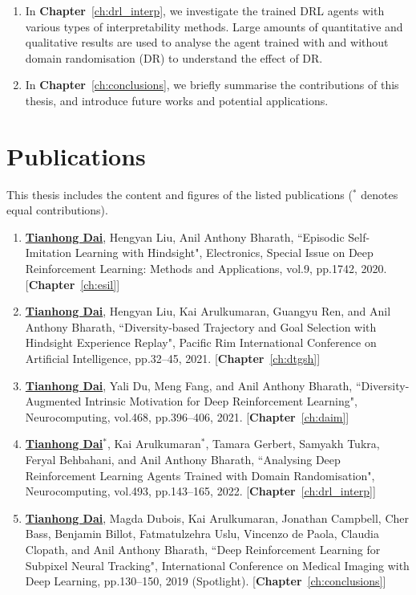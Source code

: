 \begin{enumerate}
    \item In \textbf{Chapter}~\ref{ch:drl_interp}, we investigate the trained DRL agents with various types of interpretability methods. Large amounts of quantitative and qualitative results are used to analyse the agent trained with and without domain randomisation (DR) to understand the effect of DR.
    
    \item In \textbf{Chapter}~\ref{ch:conclusions}, we briefly summarise the contributions of this thesis, and introduce future works and potential applications.
\end{enumerate}
\section{Publications}
This thesis includes the content and figures of the listed publications ($^{*}$ denotes equal contributions).
\begin{enumerate}
	\item \underline{\textbf{Tianhong Dai}}, Hengyan Liu, Anil Anthony Bharath, ``Episodic Self-Imitation Learning with Hindsight", Electronics, Special Issue on Deep Reinforcement Learning: Methods and Applications, vol.9, pp.1742, 2020. [\textbf{Chapter}~\ref{ch:esil}]
	\item \underline{\textbf{Tianhong Dai}}, Hengyan Liu, Kai Arulkumaran, Guangyu Ren, and Anil Anthony Bharath, ``Diversity‐based Trajectory and Goal Selection with Hindsight Experience Replay", Pacific Rim International Conference on Artificial Intelligence, pp.32--45, 2021. [\textbf{Chapter}~\ref{ch:dtgsh}]
	\item \underline{\textbf{Tianhong Dai}}, Yali Du, Meng Fang, and Anil Anthony Bharath, ``Diversity-Augmented Intrinsic Motivation for Deep Reinforcement Learning", Neurocomputing, vol.468, pp.396--406, 2021. [\textbf{Chapter}~\ref{ch:daim}]
	\item \underline{\textbf{Tianhong Dai}$^{*}$}, Kai Arulkumaran$^{*}$, Tamara Gerbert, Samyakh Tukra, Feryal Behbahani, and Anil Anthony Bharath, ``Analysing Deep Reinforcement Learning Agents Trained with Domain Randomisation", Neurocomputing, vol.493, pp.143--165, 2022. [\textbf{Chapter}~\ref{ch:drl_interp}]
	\item \underline{\textbf{Tianhong Dai}}, Magda Dubois, Kai Arulkumaran, Jonathan Campbell, Cher Bass, Benjamin Billot, Fatmatulzehra Uslu, Vincenzo de Paola, Claudia Clopath, and Anil Anthony Bharath, ``Deep Reinforcement Learning for Subpixel Neural Tracking", International Conference on Medical Imaging with Deep Learning, pp.130--150, 2019 (Spotlight). [\textbf{Chapter}~\ref{ch:conclusions}]
\end{enumerate}

